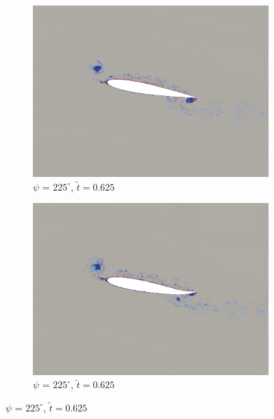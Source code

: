 \begin{figure}[H]
\centering

\begin{subfigure}[b]{0.4\textwidth}
	\centering
	 \includegraphics[width=1\textwidth]{figures/mu_2pt0/vorticity/baseline/phase_225.png}
	\caption{ $\psi$ = $225^\circ$, $\tilde{t}=0.625$}
	\label{fig:mu_2pt0_non-actuated_psi225}
\end{subfigure}
\begin{subfigure}[b]{0.4\textwidth}
	\centering
	 \includegraphics[width=1\textwidth]{figures/mu_2pt0/vorticity/AC/phase_225.png}
	\caption{ $\psi$ = $225^\circ$,  $\tilde{t}=0.625$}
	\label{fig:mu_2pt0_AC_psi225}
\end{subfigure}

	


\end{figure}
